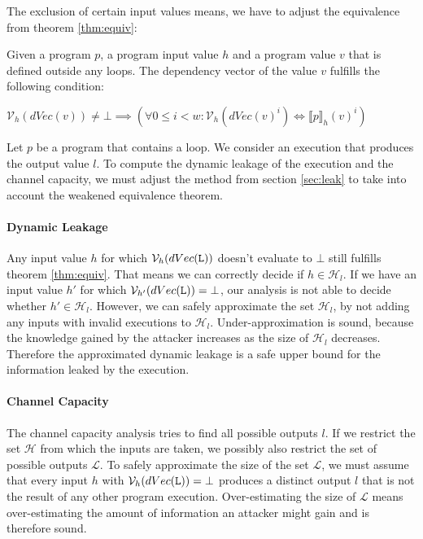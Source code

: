 The exclusion of certain input values means, we have to adjust the equivalence from theorem \ref{thm:equiv}:

\begin{theorem}\label{thm:weak}
    Given a program $p$, a program input value $h$ and a program value $v$ that is defined outside any loops. The dependency vector of the value $v$ fulfills the following condition:
    \begin{center}
        $\mathcal{V}_h(dVec(v)) \neq \bot \implies ( \forall 0 \leq i < w: \mathcal{V}_h(dVec(v)^i) \iff \llbracket p \rrbracket_h (v)^i)$
    \end{center}
\end{theorem}

Let $p$ be a program that contains a loop. We consider an execution that produces the output value $l$.
To compute the dynamic leakage of the execution and the channel capacity, we must adjust the method from section \ref{sec:leak} to take into account the weakened equivalence theorem.

\paragraph{Dynamic Leakage}
Any input value $h$ for which $\mathcal{V}_h(dVec(\mathtt{L}))$ doesn't evaluate to $\bot$ still fulfills theorem \ref{thm:equiv}. That means we can correctly decide if $h \in \mathcal{H}_l$. If we have an input value $h'$ for which $\mathcal{V}_{h'}(dVec(\mathtt{L})) = \bot$, our analysis is not able to decide whether $h' \in \mathcal{H}_l$. However, we can safely approximate the set $\mathcal{H}_l$, by not adding any inputs with invalid executions to $\mathcal{H}_l$. Under-approximation is sound, because the knowledge gained by the attacker increases as the size of $\mathcal{H}_l$ decreases. Therefore the approximated dynamic leakage is a safe upper bound for the information leaked by the execution.

\paragraph{Channel Capacity}
The channel capacity analysis tries to find all possible outputs $l$. If we restrict the set $\mathcal{H}$ from which the inputs are taken, we possibly also restrict the set of possible outputs $\mathcal{L}$. To safely approximate the size of the set $\mathcal{L}$, we must assume that every input $h$ with $\mathcal{V}_h(dVec(\mathtt{L})) = \bot$ produces a distinct output $l$ that is not the result of any other program execution. Over-estimating the size of $\mathcal{L}$ means over-estimating the amount of information an attacker might gain and is therefore sound.


